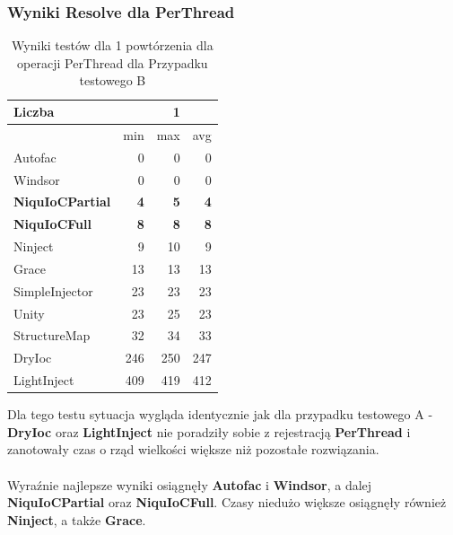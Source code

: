 \documentclass[12pt]{article}
\begin{document}
\subsubsection{Wyniki Resolve dla PerThread}
\begin{table}[H]
\captionsetup{belowskip=0pt,aboveskip=0pt}
\begin{center}
\begin{small}
	\begin{tabular}{ | l | r r r | }
    		\hline
Liczba & & 1 & \\ \hline
 & min & max & avg \\ \hline
Autofac & 0 & 0 & 0 \\ \hline
Windsor & 0 & 0 & 0 \\ \hline
\textbf{NiquIoCPartial} & \textbf{4} & \textbf{5} & \textbf{4} \\ \hline
\textbf{NiquIoCFull} & \textbf{8} & \textbf{8} & \textbf{8} \\ \hline
Ninject & 9 & 10 & 9 \\ \hline
Grace & 13 & 13 & 13 \\ \hline
SimpleInjector & 23 & 23 & 23 \\ \hline
Unity & 23 & 25 & 23 \\ \hline
StructureMap & 32 & 34 & 33 \\ \hline
DryIoc & 246 & 250 & 247 \\ \hline
LightInject & 409 & 419 & 412 \\ \hline
  	\end{tabular}
\end{small}
\end{center}
\caption{Wyniki testów dla 1 powtórzenia dla operacji PerThread dla Przypadku testowego B}
\label{TestCaseB_PerThread1}
\end{table}
Dla tego testu sytuacja wygląda identycznie jak dla przypadku testowego A - \textbf{DryIoc} oraz \textbf{LightInject} nie poradziły sobie z rejestracją \textbf{PerThread} i zanotowały czas o rząd wielkości większe niż pozostałe rozwiązania.\\
\\
Wyraźnie najlepsze wyniki osiągnęły \textbf{Autofac} i \textbf{Windsor}, a dalej \textbf{NiquIoCPartial} oraz \textbf{NiquIoCFull}. Czasy niedużo większe osiągnęły również \textbf{Ninject}, a także \textbf{Grace}.
\\ \\
\end{document}

